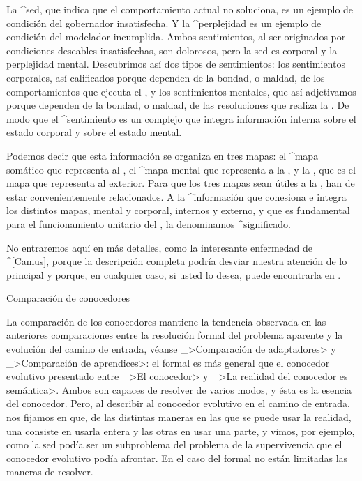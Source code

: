La ^{sed}, que indica que el comportamiento actual no soluciona, es un
ejemplo de condición del gobernador insatisfecha. Y la ^{perplejidad} es
un ejemplo de condición del modelador incumplida. Ambos sentimientos, al
ser originados por condiciones deseables insatisfechas, son dolorosos,
pero la sed es corporal y la perplejidad mental. Descubrimos así dos
tipos de sentimientos: los sentimientos corporales, así calificados
porque dependen de la bondad, o maldad, de los comportamientos que
ejecuta el {\cuerpo}, y los sentimientos mentales, que así adjetivamos
porque dependen de la bondad, o maldad, de las resoluciones que realiza
la {\mente}. De modo que el ^{sentimiento} es un complejo que integra
información interna sobre el estado corporal y sobre el estado mental.

Podemos decir que esta información se organiza en tres mapas: el ^{mapa
somático} que representa al {\cuerpo}, el ^{mapa mental} que representa
a la {\mente}, y la {\realidad}, que es el mapa que representa al
exterior. Para que los tres mapas sean útiles a la {\inteligencia}, han
de estar convenientemente relacionados. A la ^{información} que
cohesiona e integra los distintos mapas, mental y corporal, internos y
externo, y que es fundamental para el funcionamiento unitario del
{\conocedor}, la denominamos ^{significado}.

No entraremos aquí en más detalles, como la interesante enfermedad de
^[Camus], porque la descripción completa podría desviar nuestra atención
de lo principal y porque, en cualquier caso, si usted lo desea, puede
encontrarla en .


\Section Comparación de conocedores

La comparación de los conocedores mantiene la tendencia observada en las
anteriores comparaciones entre la resolución formal del problema
aparente y la evolución del camino de entrada, véanse _>Comparación de
adaptadores> y _>Comparación de aprendices>: el {\conocedor} formal es
más general que el conocedor evolutivo presentado entre _>El conocedor>
y _>La realidad del conocedor es semántica>. Ambos son capaces de
resolver de varios modos, y ésta es la esencia del conocedor. Pero, al
describir al conocedor evolutivo en el camino de entrada, nos fijamos en
que, de las distintas maneras en las que se puede usar la realidad, una
consiste en usarla entera y las otras en usar una parte, y vimos, por
ejemplo, como la sed podía ser un subproblema del problema de la
supervivencia que el conocedor evolutivo podía afrontar. En el caso del
{\conocedor} formal no están limitadas las maneras de resolver.

